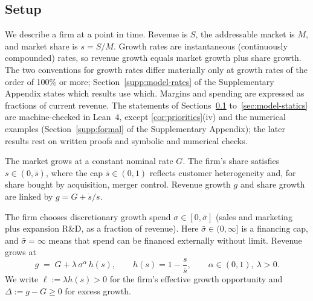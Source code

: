 \subsection{Setup}\label{sec:model-setup}

We describe a firm at a point in time. Revenue is $S$, the addressable market is $M$, and market share is $s=S/M$. Growth rates are instantaneous (continuously compounded) rates, so revenue growth equals market growth plus share growth. The two conventions for growth rates differ materially only at growth rates of the order of 100\% or more; Section~\ref{supp:model-rates} of the Supplementary Appendix states which results use which. Margins and spending are expressed as fractions of current revenue. The statements of Sections~\ref{sec:model-setup} to~\ref{sec:model-statics} are machine-checked in Lean~4, except \autoref{cor:priorities}(iv) and the numerical examples (Section~\ref{supp:formal} of the Supplementary Appendix); the later results rest on written proofs and symbolic and numerical checks.

\begin{assumption}\label{ass:market}
The market grows at a constant nominal rate $G$. The firm's share satisfies $s\in(0,\bar s)$, where the cap $\bar s\in(0,1)$ reflects customer heterogeneity and, for share bought by acquisition, merger control. Revenue growth $g$ and share growth are linked by $g=G+\dot s/s$.
\end{assumption}

\begin{assumption}\label{ass:growth}
The firm chooses discretionary growth spend $\sigma\in[0,\bar\sigma]$ (sales and marketing plus expansion R\&D, as a fraction of revenue). Here $\bar\sigma\in(0,\infty]$ is a financing cap, and $\bar\sigma=\infty$ means that spend can be financed externally without limit. Revenue grows at
\begin{equation}\label{eq:growth}
g \;=\; G+\lambda\,\sigma^{\alpha}\,h(s),\qquad h(s)=1-\frac{s}{\bar s},\qquad \alpha\in(0,1),\ \lambda>0 .
\end{equation}
We write $\ell:=\lambda h(s)>0$ for the firm's effective growth opportunity and $\Delta:=g-G\ge 0$ for excess growth.
\end{assumption}

